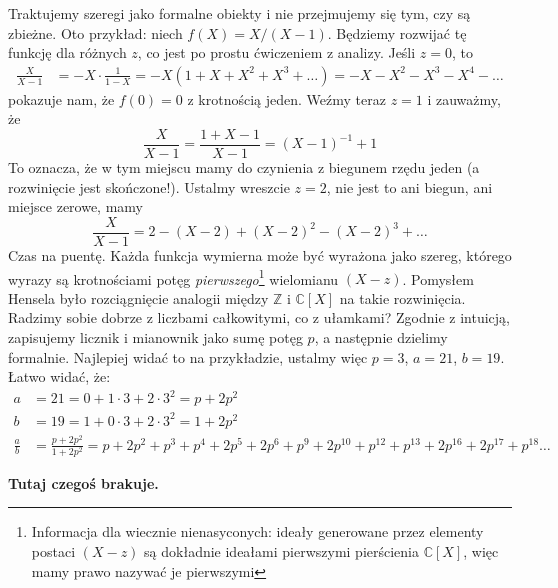 \documentclass[a4paper,fleqn,9pt]{extarticle}
\begin{document}
Traktujemy szeregi jako formalne obiekty i nie przejmujemy się tym, czy są zbieżne.
Oto przykład: niech $f(X) = {X}/{(X-1)}$.
Będziemy rozwijać tę funkcję dla różnych $z$, co jest po prostu ćwiczeniem z analizy. Jeśli $z=0$, to 
\begin{align*}
\frac{X}{X-1} & 
 = -X \cdot \frac{1}{1-X} 
 = -X (1+X+X^2+X^3+\dots)
 = -X -X^2-X^3-X^4-\dots
\end{align*}
pokazuje nam, że $f(0) = 0$ z krotnością jeden.
Weźmy teraz $z=1$ i zauważmy, że
\begin{equation*}
\frac{X}{X-1}
 = \frac{1+X-1}{X-1}
 = (X-1)^{-1}+ 1
\end{equation*}
To oznacza, że w tym miejscu mamy do czynienia z biegunem rzędu jeden (a rozwinięcie jest skończone!).
Ustalmy wreszcie $z=2$, nie jest to ani biegun, ani miejsce zerowe, mamy
\begin{equation*}
\frac{X}{X-1}
 = 2 - (X-2) + (X-2)^2-(X-2)^3+\dots
\end{equation*}
Czas na puentę.
Każda funkcja wymierna może być wyrażona jako szereg, którego wyrazy są krotnościami potęg \emph{pierwszego}\footnote{Informacja dla wiecznie nienasyconych: ideały generowane przez elementy postaci $(X-z)$ są dokładnie ideałami pierwszymi pierścienia $\mathbb C[X]$, więc mamy prawo nazywać je pierwszymi} wielomianu $(X-z)$.
Pomysłem Hensela było rozciągnięcie analogii między $\mathbb Z$ i $\mathbb C[X]$ na takie rozwinięcia.
Radzimy sobie dobrze z liczbami całkowitymi, co z ułamkami? 
Zgodnie z intuicją, zapisujemy licznik i mianownik jako sumę potęg $p$, a następnie dzielimy formalnie.
Najlepiej widać to na przykładzie, ustalmy więc $p=3$, $a=21$, $b=19$.
Łatwo widać, że:
\begin{align*}
a & = 21= 0+1\cdot 3+2\cdot 3^2 = p+2p^2 \\
b & = 19 = 1 + 0 \cdot 3 + 2 \cdot 3^2 = 1+2p^2 \\
\frac{a}{b} &
 = \frac{p+2p^2}{1+2p^2}
 = p + 2p^2 + p^3 + p^4 + 2p^5 + 2p^6 + p^9 + 2p^{10} + p^{12} + p^{13} + 2p^{16} + 2p^{17} + p^{18}\dots
\end{align*}

\textbf{Tutaj czegoś brakuje.}

\end{document}
